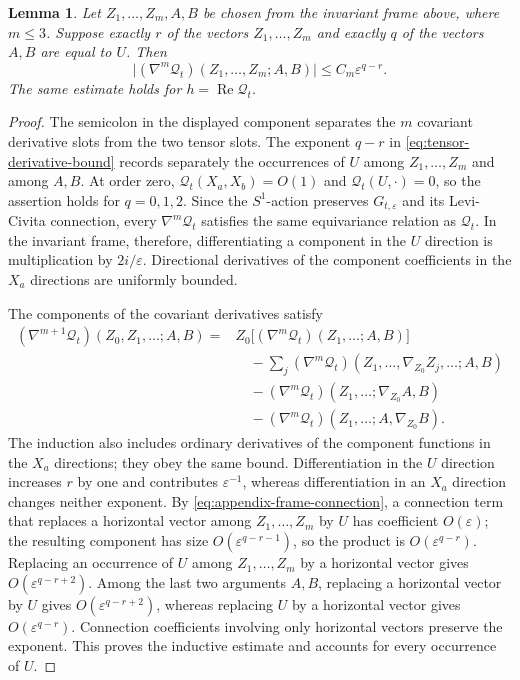 \documentclass[11pt]{article}
\newtheorem{lemma}[theorem]{Lemma}
\theoremstyle{definition}
\theoremstyle{remark}
\newcommand{\eps}{\varepsilon}
\begin{document}
\begin{lemma}                                                                       \label{lem:tensor-derivatives}
Let $Z_1,\ldots,Z_m,A,B$ be chosen from the invariant frame above, where
$m\leq3$.  Suppose exactly $r$ of the vectors $Z_1,\ldots,Z_m$ and exactly
$q$ of the vectors $A,B$ are equal to $U$.  Then
\begin{equation}                                                                    \label{eq:tensor-derivative-bound}
 \bigl| (\nabla^m\mathcal Q_t)(Z_1,\ldots,Z_m;A,B)\bigr|
 \leq C_m\eps^{q-r}.
\end{equation}
The same estimate holds for $h=\operatorname{Re}\mathcal Q_t$.
\end{lemma}

\begin{proof}
The semicolon in the displayed component separates the $m$ covariant
derivative slots from the two tensor slots.
The exponent $q-r$ in \eqref{eq:tensor-derivative-bound} records separately the
occurrences of $U$ among $Z_1,\ldots,Z_m$ and among $A,B$.
At order zero, $\mathcal Q_t(X_a,X_b)=O(1)$ and
$\mathcal Q_t(U,\cdot)=0$, so the assertion holds for $q=0,1,2$.
Since the $S^1$-action preserves $G_{t,\eps}$ and its Levi-Civita
connection, every $\nabla^m\mathcal Q_t$ satisfies the same equivariance
relation as $\mathcal Q_t$.  In the invariant frame, therefore,
differentiating a component in the $U$ direction is multiplication by
$2i/\eps$.  Directional derivatives of the component coefficients in the
$X_a$ directions are uniformly bounded.

The components of the covariant derivatives satisfy
\[
 \begin{aligned}
 (\nabla^{m+1}\mathcal Q_t)(Z_0,Z_1,\ldots;A,B)
 ={}&Z_0\bigl[(\nabla^m\mathcal Q_t)(Z_1,\ldots;A,B)\bigr]\\
 &\quad -\sum_j(\nabla^m\mathcal Q_t)
   (Z_1,\ldots,\nabla_{Z_0}Z_j,\ldots;A,B)\\
 &\quad -(\nabla^m\mathcal Q_t)(Z_1,\ldots;\nabla_{Z_0}A,B)\\
 &\quad -(\nabla^m\mathcal Q_t)(Z_1,\ldots;A,\nabla_{Z_0}B).
 \end{aligned}
\]
The induction also includes ordinary derivatives of the component functions
in the $X_a$ directions; they obey the same bound.  Differentiation
in the $U$ direction
increases $r$ by one and contributes $\eps^{-1}$, whereas differentiation in
an $X_a$ direction changes neither exponent.  By
\eqref{eq:appendix-frame-connection}, a connection term that replaces a
horizontal vector among $Z_1,\ldots,Z_m$ by $U$ has coefficient $O(\eps)$;
the resulting component has size $O(\eps^{q-r-1})$, so the product is
$O(\eps^{q-r})$.  Replacing an occurrence of $U$ among
$Z_1,\ldots,Z_m$ by a horizontal vector gives $O(\eps^{q-r+2})$.  Among
the last two arguments $A,B$, replacing a horizontal vector by $U$ gives
$O(\eps^{q-r+2})$, whereas replacing $U$ by a horizontal vector gives
$O(\eps^{q-r})$.  Connection coefficients involving only horizontal vectors
preserve the exponent.  This proves the inductive estimate and accounts for every
occurrence of $U$.


\end{proof}
\end{document}
